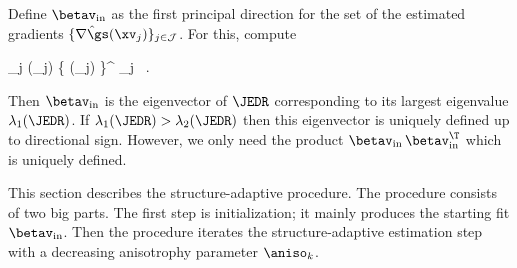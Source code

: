 Define \( \betav_{\init} \) as the first principal direction
for the set of the estimated gradients \( \{ \hat{\nabla \gs}(\xv_{j}) \}_{j \in \JJJ} \).
For this, compute
\begin{EQA}[c]
	\JEDR
	\eqdef
	\sum_{j \in \JJJ} \hat{\nabla \gs}(\xv_{j}) \{ \hat{\nabla \gs}(\xv_{j}) \}^{\T}
	\neff_{j}
	\, .
\label{uhcudiiy66yhjikfed}
\end{EQA}
Then \( \betav_{\init} \) is the eigenvector of \( \JEDR \) corresponding to its largest eigenvalue
\( \lambda_{1}(\JEDR) \).
If \( \lambda_{1}(\JEDR) > \lambda_{2}(\JEDR) \) then this eigenvector is uniquely defined up to directional sign.
However, we only need the product \( \betav_{\init} \, \betav_{\init}^{\T} \) which is uniquely defined.




This section describes the structure-adaptive procedure.
The procedure consists of two big parts.
The first step is initialization; it mainly produces the starting fit \( \betav_{\init} \).
Then the procedure iterates the structure-adaptive estimation step with a decreasing anisotrophy parameter
\( \aniso_{k} \).

